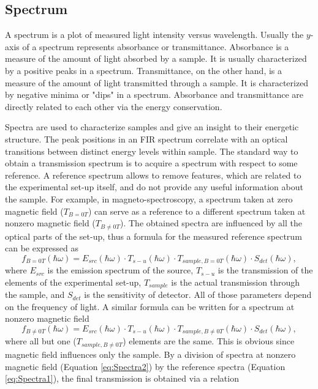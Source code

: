 \documentclass[titlepage,a4paper]{book}
\newcommand{\wciecie}{\quad\phantom{v}}
\begin{document}
\subsection{Spectrum}
\wciecie
A spectrum is a plot of measured light intensity versus wavelength. Usually the $y$-axis of a spectrum represents absorbance or transmittance. Absorbance is a measure of the amount of light absorbed by a sample. It is usually characterized by a positive peaks in a spectrum. Transmittance, on the other hand, is a measure of the amount of light transmitted through a sample. It is characterized by negative minima or "dips" in a spectrum. Absorbance and transmittance are directly related to each other via the energy conservation.

Spectra are used to characterize samples and give an insight to their energetic structure. The peak positions in an FIR spectrum correlate with an optical transitions between distinct energy levels within sample. The standard way to obtain a transmission spectrum is to acquire a spectrum with respect to some reference. A reference spectrum allows to remove features, which are related to the experimental set-up itself, and do not provide any useful information about the sample. For example, in magneto-spectroscopy, a spectrum taken at zero magnetic field ($T_{B=0T}$) can serve as a reference to a different spectrum taken at nonzero magnetic field ($T_{B\neq 0T}$). The obtained spectra are influenced by all the optical parts of the set-up, thus a formula for the measured reference spectrum can be expressed as 
\begin{equation}
\label{eq:Spectra1}
f_{B=0T}(\hbar\omega) = E_{src}(\hbar\omega)\cdot T_{s-u}(\hbar\omega)\cdot T_{sample,B=0T}(\hbar\omega)\cdot S_{det}(\hbar\omega),
\end{equation}
where $E_{src}$ is the emission spectrum of the source, $T_{s-u}$ is the transmission of the elements of the experimental set-up, $T_{sample}$ is the actual transmission through the sample, and $S_{det}$ is the sensitivity of detector. All of those parameters depend on the frequency of light. A similar formula can be written for a spectrum at nonzero magnetic field
\begin{equation}
\label{eq:Spectra2}
f_{B\neq 0T}(\hbar\omega) = E_{src}(\hbar\omega)\cdot T_{s-u}(\hbar\omega)\cdot T_{sample,B\neq 0T}(\hbar\omega)\cdot S_{det}(\hbar\omega),
\end{equation}
where all but one ($T_{sample,B\neq 0T}$) elements are the same. This is obvious since magnetic field influences only the sample. By a division of spectra at nonzero magnetic field (Equation \ref{eq:Spectra2}) by the reference spectra (Equation \ref{eq:Spectra1}), the final transmission is obtained via a relation
\end{document}
